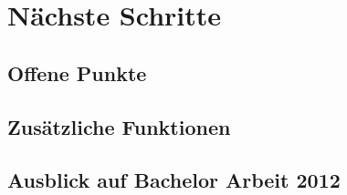 \section{Nächste Schritte}
\subsection{Offene Punkte}
\subsection{Zusätzliche Funktionen}
\subsection{Ausblick auf Bachelor Arbeit 2012}
